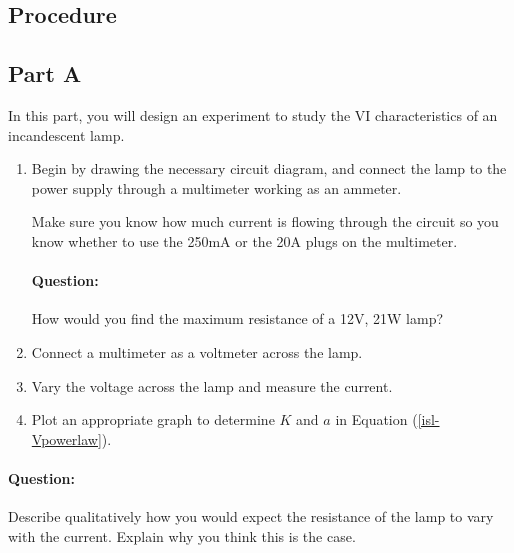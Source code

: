 \begin{refsection}
\section*{Procedure}

\subsection*{Part A}

In this part, you will design an experiment to study the VI characteristics of an incandescent lamp. 

\begin{enumerate}
    \item  Begin by drawing the necessary circuit diagram, and connect the lamp to the power supply through a multimeter working as an ammeter. 
    
    \begin{imp} 
        Make sure you know how much current is flowing through the circuit so you know whether to use the 250mA or the 20A plugs on the multimeter. 
    \end{imp}
    
    \begin{question}
        \paragraph{Question:} How would you find the maximum resistance of a 12V, 21W lamp?
    \end{question}
    
    \item Connect a multimeter as a voltmeter across the lamp.
    
    \item Vary the voltage across the lamp and measure the current.
    
    \item Plot an appropriate graph to determine $K$ and $a$ in Equation (\ref{isl-Vpowerlaw}).
\end{enumerate}


\begin{question}
\paragraph{Question:} Describe qualitatively how you would expect the resistance of the lamp to vary with the current. Explain why you think this is the case.
\end{question}


\end{refsection}
